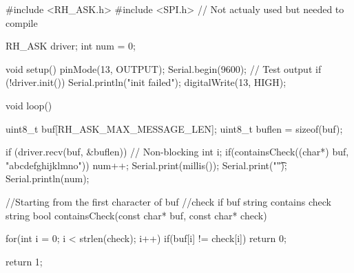 #include <RH_ASK.h>
#include <SPI.h> // Not actualy used but needed to compile

RH_ASK driver;
int num = 0;

void setup()
{
    pinMode(13, OUTPUT);
    Serial.begin(9600);	// Test output
    if (!driver.init())
         Serial.println("init failed");
    digitalWrite(13, HIGH);
}

void loop()
{
    uint8_t buf[RH_ASK_MAX_MESSAGE_LEN];
    uint8_t buflen = sizeof(buf);

    if (driver.recv(buf, &buflen)) // Non-blocking
    {
      int i;
      if(containsCheck((char*) buf, "abcdefghijklmno"))
        num++;
      Serial.print(millis());
      Serial.print("\t");
      Serial.println(num);
    }
}
 
//Starting from the first character of buf
//check if buf string contains check string 
bool containsCheck(const char* buf, const char* check){
  for(int i = 0; i < strlen(check); i++)
    if(buf[i] != check[i])
      return 0;
      
  return 1;  
}